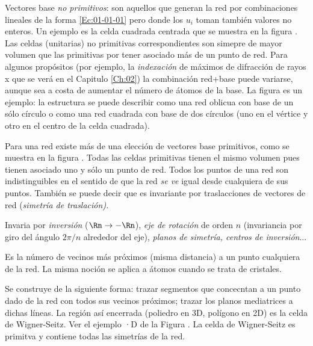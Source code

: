 \begin{definition}
    Vectores base {\it no primitivos}: son aquellos que generan la red por combinaciones lineales de la forma \ref{Ec:01-01-01} pero donde los $u_i$ toman también valores no enteros. Un ejemplo es la celda cuadrada centrada que se muestra en la figura . Las celdas (unitarias) no primitivas correspondientes son simepre de mayor volumen que las primitivas por tener asociado más de un punto de red. Para algunos propósitos (por ejemplo, la {\it indexación} de máximos de difracción de rayos x que se verá en el Capitulo \ref{Ch:02}) la combinación red+base puede variarse, aunque sea a costa de aumentar el número de átomos de la base. La figura es un ejemplo: la estructura se puede describir como una red oblicua con base de un sólo círculo o como una red cuadrada con base de dos círculos (uno en el vértice y otro en el centro de la celda cuadrada).
\end{definition}

\begin{definition}
    Para una red existe más de una elección de vectores base primitivos, como se muestra en la figura . Todas las celdas primitivas tienen el mismo volumen pues tienen asociado uno y sólo un punto de red. Todos los puntos de una red son indistinguibles en el sentido de que la red {\it se ve} igual desde cualquiera de sus puntos. También se puede decir que es invariante por traslacciones de vectores de red (\it{simetría de traslación}).          
\end{definition}

\begin{definition}
    Invaria por {\it inversión} ($\Rn \rightarrow - \Rn$), {\it eje de rotación} de orden $n$ (invariancia por giro del ángulo $2\pi/n$ alrededor del eje), {\it planos de simetría, centros de inversión}...    
\end{definition}

\begin{definition}
    Es la número de vecinos más próximos (misma distancia) a un punto cualquiera de la red. La misma noción se aplica a átomos cuando se trata de cristales.
\end{definition}

\begin{definition}
    Se construye de la siguiente forma: trazar segmentos que concecntan a un punto dado de la red con todos sus vecinos próximos; trazar los planos mediatrices a dichas líneas. La región así encerrada (poliedro en 3D, polígono en 2D) es la celda de Wigner-Seitz. Ver el ejemplo ·D de la Figura  . La celda de Wigner-Seitz es primitva y contiene todas las simetrías de la red.    
\end{definition}

